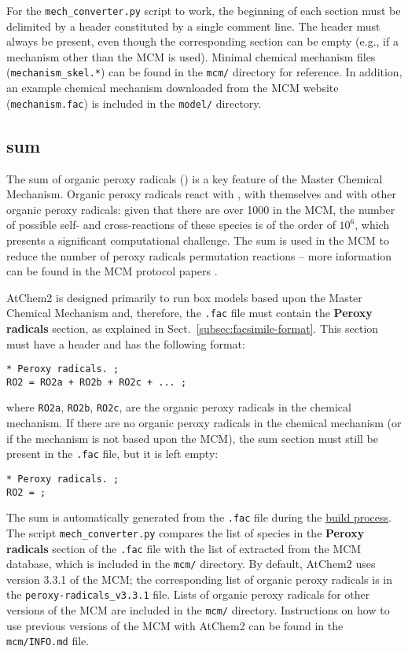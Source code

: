 For the \texttt{mech\_converter.py} script to work, the beginning of
each section must be delimited by a header constituted by a single
comment line. The header must always be present, even though the
corresponding section can be empty (e.g., if a mechanism other than
the MCM is used). Minimal chemical mechanism files
(\texttt{mechanism\_skel.*}) can be found in the \texttt{mcm/}
directory for reference. In addition, an example chemical mechanism
downloaded from the MCM website (\texttt{mechanism.fac}) is included
in the \texttt{model/} directory.

\subsection{ sum} \label{subsec:ro2-sum}

The sum of organic peroxy radicals () is a key feature of the
Master Chemical Mechanism. Organic peroxy radicals react with
, with themselves and with other organic peroxy radicals:
given that there are over 1000  in the MCM, the number of
possible self- and cross-reactions of these species is of the order of
$10^6$, which presents a significant computational challenge. The
 sum is used in the MCM to reduce the number of peroxy
radicals permutation reactions -- more information can be found in the
MCM protocol papers \citep{jenkin_1997, saunders_2003}.

AtChem2 is designed primarily to run box models based upon the Master
Chemical Mechanism and, therefore, the \texttt{.fac} file must contain
the \textbf{Peroxy radicals} section, as explained in
Sect.~\ref{subsec:facsimile-format}. This section must have a header
and has the following format:

\begin{verbatim}
* Peroxy radicals. ;
RO2 = RO2a + RO2b + RO2c + ... ;
\end{verbatim}

where \texttt{RO2a}, \texttt{RO2b}, \texttt{RO2c}, are the organic
peroxy radicals in the chemical mechanism. If there are no organic
peroxy radicals in the chemical mechanism (or if the mechanism is not
based upon the MCM), the  sum section must still be present in
the \texttt{.fac} file, but it is left empty:

\begin{verbatim}
* Peroxy radicals. ;
RO2 = ;
\end{verbatim}

The  sum is automatically generated from the \texttt{.fac}
file during the \hyperref[subsec:build-process]{build process}. The
script \texttt{mech\_converter.py} compares the list of species in the
\textbf{Peroxy radicals} section of the \texttt{.fac} file with the
list of  extracted from the MCM database, which is included in
the \texttt{mcm/} directory. By default, AtChem2 uses version 3.3.1 of
the MCM; the corresponding list of organic peroxy radicals is in the
\texttt{peroxy-radicals\_v3.3.1} file. Lists of organic peroxy
radicals for other versions of the MCM are included in the
\texttt{mcm/} directory. Instructions on how to use previous versions
of the MCM with AtChem2 can be found in the \texttt{mcm/INFO.md} file.

